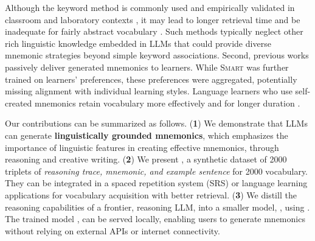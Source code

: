 Although the keyword method is commonly used and empirically validated in classroom and laboratory contexts \citetext{\citealp{atkinsonApplicationMnemonicKeyword1975}, \citealp{pressleyMnemonicKeywordMethod1982}}, it may lead to longer retrieval time \citep{vanhellKeywordMnemonicsRote1997} and be inadequate for fairly abstract vocabulary \citetext{\citealp{CamposLIMITATIONS2003}, \citealp{CamposUSING2011}}. Such methods typically neglect other rich linguistic knowledge embedded in LLMs that could provide diverse mnemonic strategies beyond simple keyword associations. Second, previous works passively deliver generated mnemonics to learners. While \textsc{Smart} \citep{balepurSMART2024} was further trained on learners' preferences, these preferences were aggregated, potentially missing alignment with individual learning styles. Language learners who use self-created mnemonics retain vocabulary more effectively and for longer duration \citep{madanExploringWordMemorability2021}.

Our contributions can be summarized as follows. (\textbf{1}) We demonstrate that LLMs can generate \textbf{linguistically grounded mnemonics}, which emphasizes the importance of linguistic features in creating effective mnemonics, through reasoning and creative writing. (\textbf{2}) We present \links, a synthetic dataset of 2000 triplets of \textit{reasoning trace, mnemonic, and example sentence} for 2000 vocabulary. They can be integrated in a spaced repetition system (SRS) or language learning applications for vocabulary acquisition with better retrieval. (\textbf{3}) We distill the reasoning capabilities of a frontier, reasoning LLM, into a smaller model, \studentmodel, using \citep{DeepSeek-AIDEEPSEEKR12025}. The trained model \links, can be served locally, enabling users to generate mnemonics without relying on external APIs or internet connectivity.
